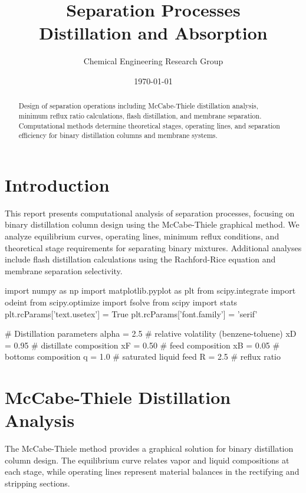 \documentclass[11pt,a4paper]{article}
\title{Separation Processes\\Distillation and Absorption}
\author{Chemical Engineering Research Group}
\date{\today}
\begin{document}
\maketitle

\begin{abstract}
Design of separation operations including McCabe-Thiele distillation analysis, minimum reflux ratio calculations, flash distillation, and membrane separation. Computational methods determine theoretical stages, operating lines, and separation efficiency for binary distillation columns and membrane systems.
\end{abstract}

\section{Introduction}

This report presents computational analysis of separation processes, focusing on binary distillation column design using the McCabe-Thiele graphical method. We analyze equilibrium curves, operating lines, minimum reflux conditions, and theoretical stage requirements for separating binary mixtures. Additional analyses include flash distillation calculations using the Rachford-Rice equation and membrane separation selectivity.

\begin{pycode}

import numpy as np
import matplotlib.pyplot as plt
from scipy.integrate import odeint
from scipy.optimize import fsolve
from scipy import stats
plt.rcParams['text.usetex'] = True
plt.rcParams['font.family'] = 'serif'

# Distillation parameters
alpha = 2.5  # relative volatility (benzene-toluene)
xD = 0.95    # distillate composition
xF = 0.50    # feed composition
xB = 0.05    # bottoms composition
q = 1.0      # saturated liquid feed
R = 2.5      # reflux ratio

\end{pycode}

\section{McCabe-Thiele Distillation Analysis}

The McCabe-Thiele method provides a graphical solution for binary distillation column design. The equilibrium curve relates vapor and liquid compositions at each stage, while operating lines represent material balances in the rectifying and stripping sections.
\end{document}
